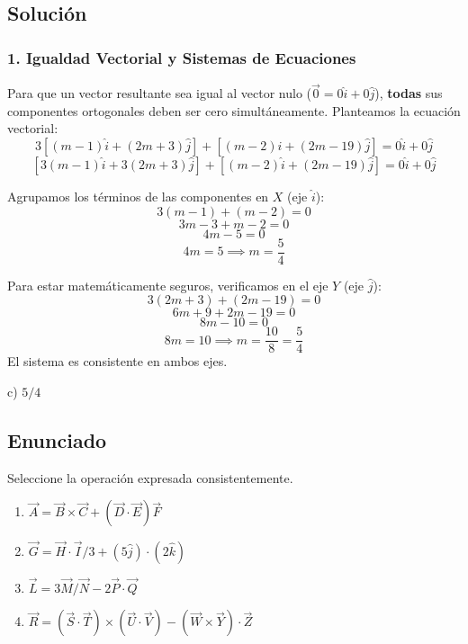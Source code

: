 \documentclass[12pt, a4paper]{article}
\begin{document}
\subsection*{Solución}

\subsubsection*{1. Igualdad Vectorial y Sistemas de Ecuaciones}
Para que un vector resultante sea igual al vector nulo ($\vec{0} = 0\hat{i} + 0\hat{j}$), \textbf{todas} sus componentes ortogonales deben ser cero simultáneamente.
Planteamos la ecuación vectorial:
$$ 3 [ (m-1)\hat{i} + (2m+3)\hat{j} ] + [ (m-2)\hat{i} + (2m-19)\hat{j} ] = 0\hat{i} + 0\hat{j} $$
$$ [3(m-1)\hat{i} + 3(2m+3)\hat{j}] + [(m-2)\hat{i} + (2m-19)\hat{j}] = 0\hat{i} + 0\hat{j} $$

Agrupamos los términos de las componentes en $X$ (eje $\hat{i}$):
$$ 3(m-1) + (m-2) = 0 $$
$$ 3m - 3 + m - 2 = 0 $$
$$ 4m - 5 = 0 $$
$$ 4m = 5 \implies m = \frac{5}{4} $$

Para estar matemáticamente seguros, verificamos en el eje $Y$ (eje $\hat{j}$):
$$ 3(2m+3) + (2m-19) = 0 $$
$$ 6m + 9 + 2m - 19 = 0 $$
$$ 8m - 10 = 0 $$
$$ 8m = 10 \implies m = \frac{10}{8} = \frac{5}{4} $$
El sistema es consistente en ambos ejes.

\begin{tcolorbox}[colback=green!5!white, colframe=green!50!black, title=Respuesta Final]
\centering \Large c) $5/4$
\end{tcolorbox}

\newpage


\subsection*{Enunciado}
Seleccione la operación expresada consistentemente.
\begin{enumerate}[label=\alph*)]
    \item $\vec{A} = \vec{B} \times \vec{C} + (\vec{D} \cdot \vec{E})\vec{F}$
    \item $\vec{G} = \vec{H} \cdot \vec{I} / 3 + (5\hat{j}) \cdot (2\hat{k})$
    \item $\vec{L} = 3\vec{M} / \vec{N} - 2\vec{P} \cdot \vec{Q}$
    \item $\vec{R} = (\vec{S} \cdot \vec{T}) \times (\vec{U} \cdot \vec{V}) - (\vec{W} \times \vec{Y}) \cdot \vec{Z}$
\end{enumerate}
\end{document}
